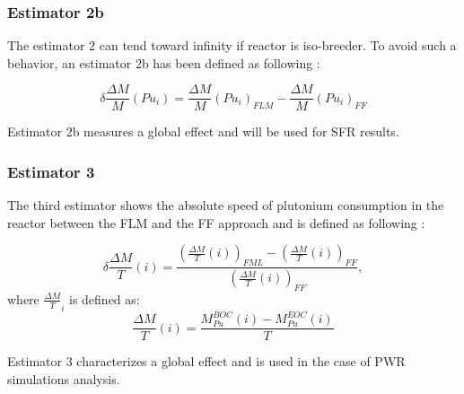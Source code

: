 \subsubsection{Estimator 2b}

The estimator 2 can tend toward infinity if reactor is iso-breeder. To avoid
such a behavior, an estimator 2b has been defined as following : 

\begin{equation}
    \delta \frac{\Delta M}{M}(Pu_i) = \frac{\Delta M}{M}(Pu_i)_{FLM} - \frac{\Delta M}{M}(Pu_i)_{FF}
\end{equation}

Estimator 2b measures a global effect and will be used for \gls{SFR} results.

\subsubsection{Estimator 3}

The third estimator shows the absolute speed of plutonium consumption in the
reactor between the \gls{FLM} and the \gls{FF} approach and is defined as
following :

\begin{equation}
    \delta{\frac{\Delta M}{T}}(i) =
        \frac{\left(\frac{\Delta M}{T}(i)\right)_{FML}
              - \left(\frac{\Delta M}{T}(i)\right)_{FF}}
             {\left(\frac{\Delta M}{T}(i)\right)_{FF}},
\end{equation}
where $\frac{\Delta M}{T}_{i}$ is defined as:
\begin{equation}
    \frac{\Delta M}{T}(i) = \frac{M_{Pu}^{BOC}(i) -
    M_{Pu}^{EOC}(i)}{T}
\end{equation}

Estimator 3 characterizes a global effect and is used in the case of PWR
simulations analysis.

